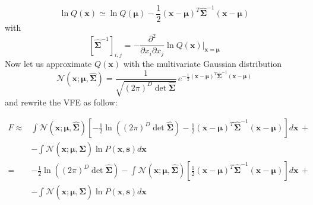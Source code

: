 \documentclass[a4paper, 10pt]{article}
\begin{document}
\begin{equation}
\ln Q(\mathbf x) \simeq \ln Q(\boldsymbol{\mu}) - \frac{1}{2} (\mathbf x-\boldsymbol \mu)^T \boldsymbol{\hat{\Sigma}}^{-1} (\mathbf x-\boldsymbol \mu)
\end{equation}
with
\begin{equation}
\left[ \boldsymbol{\hat{\Sigma}}^{-1} \right]_{i,j} = - \frac{\partial^{2} }{\partial x_i \partial x_j} \ln Q(\mathbf x) \bigg\rvert_{\mathbf x=\boldsymbol \mu} 
\end{equation}
Now let us approximate $Q(\mathbf x)$ with the multivariate Gaussian distribution
\begin{equation}
\mathcal{N}(\mathbf x;\boldsymbol \mu, \boldsymbol{\hat{\Sigma}}) = \frac{1}{\sqrt{( 2 \pi)^{D} \det \boldsymbol{\hat{\Sigma}}}} \, e^{ - \frac{1}{2} (\mathbf x-\boldsymbol \mu)^T \boldsymbol{\hat{\Sigma}}^{-1} (\mathbf x-\boldsymbol \mu)}
\end{equation}
and rewrite the VFE as follow:

\begin{equation}
\label{eqn:f1}
\begin{split}
F \approx & \int \mathcal{N}(\mathbf x; \bm \mu, \bm{\hat{\Sigma}}) \left[ -\frac{1}{2} \ln \left( (2 \pi)^{D} \det \bm{\hat{\Sigma}} \right) - \frac{1}{2} (\mathbf x-\boldsymbol \mu)^T \boldsymbol{\hat{\Sigma}}^{-1} (\mathbf x-\boldsymbol \mu) \right] d \mathbf x \, + \\
	& - \int \mathcal{N}(\mathbf x;\bm \mu,\bm{\hat{\Sigma}}) \ln P(\mathbf x,\mathbf s) d \mathbf x \\
    = & -\frac{1}{2} \ln \left( (2 \pi)^{D} \det \bm{\hat{\Sigma}} \right) - \int \mathcal{N}(\mathbf x; \bm \mu, \bm{\hat{\Sigma}}) \left[ \frac{1}{2} (\mathbf x-\boldsymbol \mu)^T \boldsymbol{\hat{\Sigma}}^{-1} (\mathbf x-\boldsymbol \mu) \right] d \mathbf x \, + \\
    & - \int \mathcal{N}(\mathbf x;\bm \mu,\bm{\hat{\Sigma}}) \ln P(\mathbf x,\mathbf s) d \mathbf x 
\end{split}
\end{equation}
\end{document}
